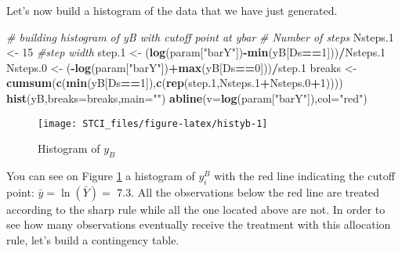 \documentclass[]{book}
\newenvironment{Shaded}{\begin{snugshade}}{\end{snugshade}}
\newcommand{\KeywordTok}[1]{\textcolor[rgb]{0.13,0.29,0.53}{\textbf{#1}}}
\newcommand{\DataTypeTok}[1]{\textcolor[rgb]{0.13,0.29,0.53}{#1}}
\newcommand{\DecValTok}[1]{\textcolor[rgb]{0.00,0.00,0.81}{#1}}
\newcommand{\StringTok}[1]{\textcolor[rgb]{0.31,0.60,0.02}{#1}}
\newcommand{\CommentTok}[1]{\textcolor[rgb]{0.56,0.35,0.01}{\textit{#1}}}
\newcommand{\OperatorTok}[1]{\textcolor[rgb]{0.81,0.36,0.00}{\textbf{#1}}}
\newcommand{\NormalTok}[1]{#1}
\theoremstyle{definition}
\theoremstyle{definition}
\theoremstyle{definition}
\theoremstyle{remark}
\begin{document}
Let's now build a histogram of the data that we have just generated.

\begin{Shaded}
\begin{Highlighting}[]
\CommentTok{# building histogram of yB with cutoff point at ybar}
\CommentTok{# Number of steps}
\NormalTok{Nsteps.}\DecValTok{1}\NormalTok{ <-}\StringTok{ }\DecValTok{15}
\CommentTok{#step width}
\NormalTok{step.}\DecValTok{1}\NormalTok{ <-}\StringTok{ }\NormalTok{(}\KeywordTok{log}\NormalTok{(param[}\StringTok{"barY"}\NormalTok{])}\OperatorTok{-}\KeywordTok{min}\NormalTok{(yB[Ds}\OperatorTok{==}\DecValTok{1}\NormalTok{]))}\OperatorTok{/}\NormalTok{Nsteps.}\DecValTok{1}
\NormalTok{Nsteps.}\DecValTok{0}\NormalTok{ <-}\StringTok{ }\NormalTok{(}\OperatorTok{-}\KeywordTok{log}\NormalTok{(param[}\StringTok{"barY"}\NormalTok{])}\OperatorTok{+}\KeywordTok{max}\NormalTok{(yB[Ds}\OperatorTok{==}\DecValTok{0}\NormalTok{]))}\OperatorTok{/}\NormalTok{step.}\DecValTok{1}
\NormalTok{breaks <-}\StringTok{ }\KeywordTok{cumsum}\NormalTok{(}\KeywordTok{c}\NormalTok{(}\KeywordTok{min}\NormalTok{(yB[Ds}\OperatorTok{==}\DecValTok{1}\NormalTok{]),}\KeywordTok{c}\NormalTok{(}\KeywordTok{rep}\NormalTok{(step.}\DecValTok{1}\NormalTok{,Nsteps.}\DecValTok{1}\OperatorTok{+}\NormalTok{Nsteps.}\DecValTok{0}\OperatorTok{+}\DecValTok{1}\NormalTok{))))}
\KeywordTok{hist}\NormalTok{(yB,}\DataTypeTok{breaks=}\NormalTok{breaks,}\DataTypeTok{main=}\StringTok{""}\NormalTok{)}
\KeywordTok{abline}\NormalTok{(}\DataTypeTok{v=}\KeywordTok{log}\NormalTok{(param[}\StringTok{"barY"}\NormalTok{]),}\DataTypeTok{col=}\StringTok{"red"}\NormalTok{)}
\end{Highlighting}
\end{Shaded}

\begin{figure}

{\centering \texttt{[image: STCI\_files/figure-latex/histyb-1]} 

}

\caption{Histogram of $y_B$}\label{fig:histyb}
\end{figure}

You can see on Figure \ref{fig:histyb} a histogram of \(y_i^B\) with the
red line indicating the cutoff point: \(\bar{y}=\ln(\bar{Y})=\) 7.3. All
the observations below the red line are treated according to the sharp
rule while all the one located above are not. In order to see how many
observations eventually receive the treatment with this allocation rule,
let's build a contingency table.
\end{document}
